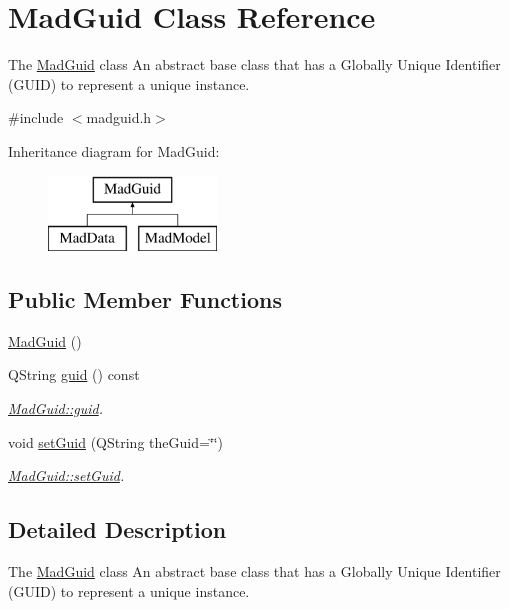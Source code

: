 \hypertarget{class_mad_guid}{\section{Mad\-Guid Class Reference}
\label{class_mad_guid}
}


The \hyperlink{class_mad_guid}{Mad\-Guid} class An abstract base class that has a Globally Unique Identifier (G\-U\-I\-D) to represent a unique instance.  




{\ttfamily \#include $<$madguid.\-h$>$}

Inheritance diagram for Mad\-Guid\-:\begin{figure}[H]
\begin{center}
\leavevmode
\includegraphics[height=2.000000cm]{class_mad_guid}
\end{center}
\end{figure}
\subsection*{Public Member Functions}
\begin{DoxyCompactItemize}
\item 
\hyperlink{class_mad_guid_a119759ea390708eab3df016639b01cc7}{Mad\-Guid} ()
\item 
Q\-String \hyperlink{class_mad_guid_abd5fd246f0be83f0b9572363a78f66be}{guid} () const 
\begin{DoxyCompactList}\small\item\em \hyperlink{class_mad_guid_abd5fd246f0be83f0b9572363a78f66be}{Mad\-Guid\-::guid}. \end{DoxyCompactList}\item 
void \hyperlink{class_mad_guid_a899833db4b57903608571b737baa5a0a}{set\-Guid} (Q\-String the\-Guid=\char`\"{}\char`\"{})
\begin{DoxyCompactList}\small\item\em \hyperlink{class_mad_guid_a899833db4b57903608571b737baa5a0a}{Mad\-Guid\-::set\-Guid}. \end{DoxyCompactList}\end{DoxyCompactItemize}


\subsection{Detailed Description}
The \hyperlink{class_mad_guid}{Mad\-Guid} class An abstract base class that has a Globally Unique Identifier (G\-U\-I\-D) to represent a unique instance. 


